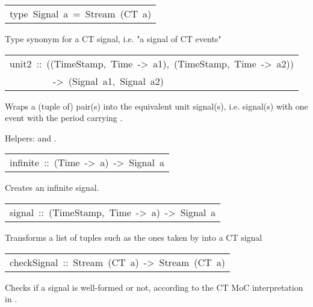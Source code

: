 \begin{haddockdesc}
\item[\begin{tabular}{@{}l}
type\ Signal\ a\ =\ Stream\ (CT\ a)
\end{tabular}]\haddockbegindoc
Type synonym for a CT signal, i.e. "a signal of CT events"\par


\item[\begin{tabular}{@{}l}
unit2\ ::\ ((TimeStamp,\ Time\ ->\ a1),\ (TimeStamp,\ Time\ ->\ a2))\\\ \ \ \ \ \ \ \ \ ->\ (Signal\ a1,\ Signal\ a2)
\end{tabular}]\haddockbegindoc
Wraps a (tuple of) pair(s)  into the equivalent
 unit signal(s), i.e. signal(s) with one event with the period
  carrying .\par
Helpers:  and .\par


\item[\begin{tabular}{@{}l}
infinite\ ::\ (Time\ ->\ a)\ ->\ Signal\ a
\end{tabular}]\haddockbegindoc
Creates an infinite signal.\par


\item[\begin{tabular}{@{}l}
signal\ ::\ {\char 91}(TimeStamp,\ Time\ ->\ a){\char 93}\ ->\ Signal\ a
\end{tabular}]\haddockbegindoc
Transforms a list of tuples such as the ones taken by 
 into a CT signal\par


\item[\begin{tabular}{@{}l}
checkSignal\ ::\ Stream\ (CT\ a)\ ->\ Stream\ (CT\ a)
\end{tabular}]\haddockbegindoc
Checks if a signal is well-formed or not, according to the CT MoC
 interpretation in .\par

\end{haddockdesc}
